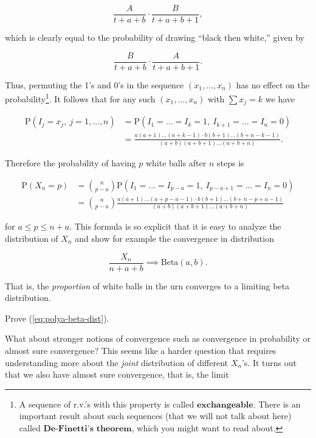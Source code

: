\[
\frac{A}{t+a+b}\cdot \frac{B}{t+a+b+1},
\]

\noindent which is clearly equal to the probability of drawing
``black then white,'' given by

\[
\frac{B}{t+a+b}\cdot \frac{A}{t+a+b+1}.
\]

\noindent Thus, permuting the 1's and 0's in the sequence
$(x_1,\ldots,x_n)$ has no effect on the
probability\footnote{A sequence of r.v.'s with this property is called
$\textbf{exchangeable}$. There is an important result
about such sequences (that we will not talk about
here) called $\textbf{De-Finetti's theorem}$, which
you might want to read about.}. It follows that for
any such $(x_1,\ldots,x_n)$ with $\sum x_j=k$ we have

\begin{align*}
\mathrm{P}(I_j = x_j,\ j=1,\ldots,n) &= \mathrm{P}(I_1=\ldots=I_k=1,\ I_{k+1}=\ldots=I_n=0) \\
&=
\tag{2}\label{eq:polyaurn-formula}
\frac{a(a+1)\ldots(a+k-1)\cdot b(b+1)\ldots(b+n-k-1)}{(a+b)(a+b+1)\ldots(a+b+n)}.
\end{align*}

\noindent Therefore the probability of having $p$ white balls
after $n$ steps is

\begin{align*}
\mathrm{P}(X_n = p) &= \binom{n}{p-a}
\mathrm{P}(I_1=\ldots=I_{p-a}=1,\ I_{p-a+1}=\ldots=I_n=0) \\
&=
\binom{n}{p-a}
\frac{a(a+1)\ldots(a+p-a-1)\cdot b(b+1)\ldots(b+n-p+a-1)}{(a+b)(a+b+1)\ldots(a+b+n)}
\end{align*}

\noindent for $a \le p \le n+a$. This formula is so explicit
that it is easy to analyze the distribution of $X_n$
and show for example the convergence in distribution

\begin{equation*} \tag{3}\label{eq:polya-beta-dist}
\frac{X_n}{n+a+b} \implies \textrm{Beta}(a,b).
\end{equation*}

\noindent That is, the \emph{proportion} of white balls in the urn
converges to a limiting beta distribution.

\begin{xexercise}
Prove (\ref{eq:polya-beta-dist}).
\end{xexercise}

\noindent What about stronger notions of convergence such as
convergence in probability or almost sure convergence?
This seems like a harder question that requires
understanding more about the \emph{joint} distribution of
different $X_n$'s. It turns out that we also have
almost sure convergence, that is, the limit

